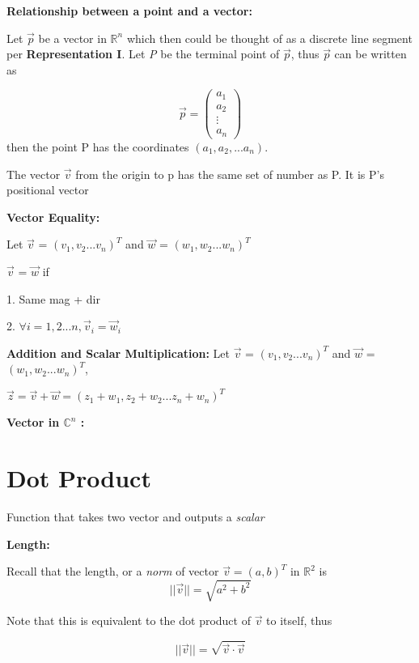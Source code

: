 \documentclass{article}
\begin{document}
\medskip

\textbf{Relationship between a point and a vector:}

Let $\vec{p}$ be a vector in $\mathbb{R} ^ n$ which then could be thought of as 
a discrete line segment per \textbf{Representation I}. Let \emph{P} be the terminal point of
$\vec{p}$, thus $\vec{p}$ can be written as 

\[
  \vec{p} = \begin{pmatrix}
      a_1 \\
      a_2 \\
      \vdots \\
      a_n
  \end{pmatrix}  
\]
then the point P has the coordinates $(a_1, a_2, ... a_n)$.

The vector $\vec{v}$ from the origin to p has the same set of number as P. 
It is P's positional vector

\medskip

\textbf{Vector Equality: }

Let $\vec{v}$ = $(v_1, v_2...v_n)^T$ and $\vec{w}$ = $(w_1, w_2...w_n)^T$

$\vec{v}$ = $\vec{w}$ if

1. Same mag + dir

2. $\forall i = 1, 2 ... n, \vec{v}_i = \vec{w}_i$

\medskip

\textbf{Addition and Scalar Multiplication:}
Let $\vec{v}$ = $(v_1, v_2...v_n)^T$ and $\vec{w}$ = $(w_1, w_2...w_n)^T$, 

$\vec{z} = \vec{v} + \vec{w} = (z_1+w_1, z_2+w_2...z_n+w_n)^T$

\medskip

\textbf{Vector in $\mathbb{C}^n$ :}

\section{Dot Product}
Function that takes two vector and outputs a \emph{scalar}

\medskip

\textbf{Length:}

Recall that the length, or a \emph{norm} of vector 
$\vec{v} = (a, b)^T $ in $\mathbb{R}^2 $ is 
\[
    ||\vec{v}|| = \sqrt{a^2 + b^2}    
\]

Note that this is equivalent to the dot product of $\vec{v}$ to itself, thus

\[
    ||\vec{v}|| =\sqrt{\vec{v} \cdot \vec{v}}  
\]
\end{document}
